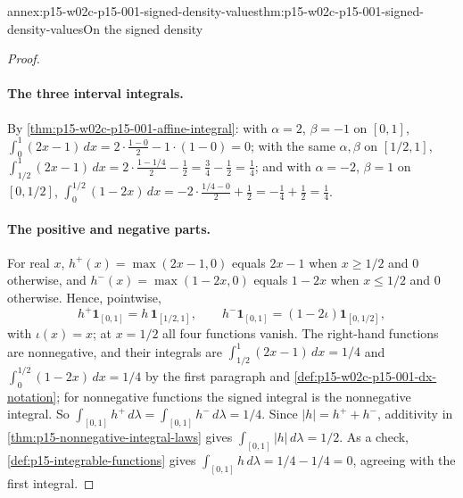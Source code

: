 \begin{annexitem}{annex:p15-w02c-p15-001-signed-density-values}{thm:p15-w02c-p15-001-signed-density-values}{On the signed density}
\begin{proof}
\paragraph{The three interval integrals.}
By \cref{thm:p15-w02c-p15-001-affine-integral}:
with \(\alpha=2\), \(\beta=-1\) on \([0,1]\),
\(\int_0^1(2x-1)\,dx=2\cdot\frac{1-0}2-1\cdot(1-0)=0\);
with the same \(\alpha,\beta\) on \([1/2,1]\),
\(\int_{1/2}^1(2x-1)\,dx=2\cdot\frac{1-1/4}2-\frac12=\frac34-\frac12=\frac14\);
and with \(\alpha=-2\), \(\beta=1\) on \([0,1/2]\),
\(\int_0^{1/2}(1-2x)\,dx=-2\cdot\frac{1/4-0}2+\frac12=-\frac14+\frac12=\frac14\).

\paragraph{The positive and negative parts.}
For real \(x\), \(h^+(x)=\max(2x-1,0)\) equals \(2x-1\) when
\(x\geq1/2\) and \(0\) otherwise, and \(h^-(x)=\max(1-2x,0)\) equals
\(1-2x\) when \(x\leq1/2\) and \(0\) otherwise. Hence, pointwise,
\[
 h^+\mathbf1_{[0,1]}=h\,\mathbf1_{[1/2,1]},\qquad
 h^-\mathbf1_{[0,1]}=(1-2\iota)\mathbf1_{[0,1/2]},
\]
with \(\iota(x)=x\); at \(x=1/2\) all four functions vanish. The
right-hand functions are nonnegative, and their integrals are
\(\int_{1/2}^1(2x-1)\,dx=1/4\) and \(\int_0^{1/2}(1-2x)\,dx=1/4\) by the
first paragraph and \cref{def:p15-w02c-p15-001-dx-notation}; for
nonnegative functions the signed integral is the nonnegative integral.
So \(\int_{[0,1]}h^+\,d\lambda=\int_{[0,1]}h^-\,d\lambda=1/4\). Since
\(|h|=h^++h^-\), additivity in \cref{thm:p15-nonnegative-integral-laws}
gives \(\int_{[0,1]}|h|\,d\lambda=1/2\). As a check,
\cref{def:p15-integrable-functions} gives
\(\int_{[0,1]}h\,d\lambda=1/4-1/4=0\), agreeing with the first integral.
\end{proof}
\end{annexitem}

